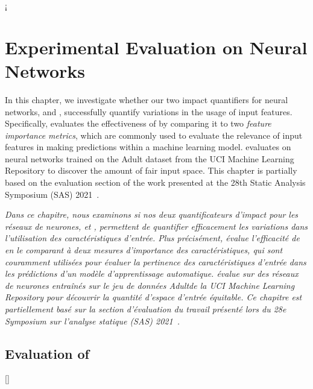 \setchapterpreamble[u]{\margintoc}¡

\chapter{Experimental Evaluation on Neural Networks}

\marginemptybox{7cm}

In this chapter, we investigate whether our two impact quantifiers for neural networks, \cf{} \changesname{} and \qlibraname{}, successfully quantify variations in the usage of input features. Specifically,  evaluates the effectiveness of \changesname{} by comparing it to two \emph{feature importance metrics}, which are commonly used to evaluate the relevance of input features in making predictions within a machine learning model.  evaluates \qlibraname{} on neural networks trained on the Adult dataset from the UCI Machine Learning Repository to discover the amount of fair input space. This chapter is partially based on the evaluation section of the work presented at the 28th Static Analysis Symposium (SAS) 2021~.

\frenchdiv


\emph{
  Dans ce chapitre, nous examinons si nos deux quantificateurs d'impact pour les réseaux de neurones, \cf{} \changesname{} et \qlibraname{}, permettent de quantifier efficacement les variations dans l'utilisation des caractéristiques d'entrée. Plus précisément,  évalue l'efficacité de \changesname{} en le comparant à deux \emph{mesures d'importance des caractéristiques}, qui sont couramment utilisées pour évaluer la pertinence des caractéristiques d'entrée dans les prédictions d'un modèle d'apprentissage automatique.  évalue \qlibraname{} sur des réseaux de neurones entraînés sur le jeu de données Adult\sidenotemark[\ref{adult-url}] de la UCI Machine Learning Repository pour découvrir la quantité d'espace d'entrée équitable. Ce chapitre est partiellement basé sur la section d'évaluation du travail présenté lors du 28e Symposium sur l'analyse statique (SAS) 2021~\cite[Section 3]{Mazzucato2021}.
}


\section{Evaluation of \changesname{}}[\changesname]




